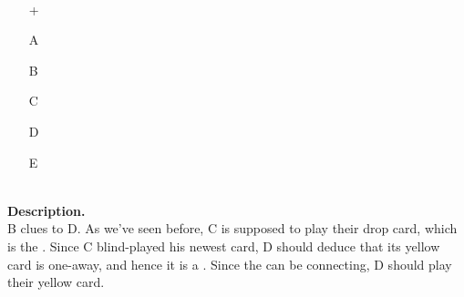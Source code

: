\begin{example}	\hfill \\
	\begin{minipage}{0.45\textwidth}
		\begin{itemize}
			\item[\Large +]      
			\item[\Large A]    
			\item[\Large B]    
			\item[\Large C]    
			\item[\Large D]    
			\item[\Large E]    
		\end{itemize}
	\end{minipage}%
	\begin{minipage}{0.55\textwidth}
		\hfill \\
		
		\textbf{Description.} \\
		
		B clues  to D. As we've seen before, C is supposed to play their drop card, which is the . Since C blind-played his newest card, D should deduce that its yellow card is one-away, and hence it is a . Since the  can be connecting, D should play their yellow card.
	\end{minipage}
\end{example} \vspace{0.15 cm}

